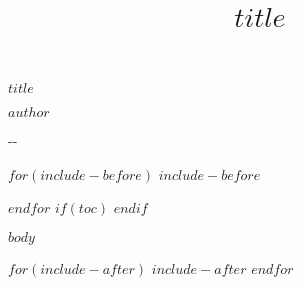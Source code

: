 \documentclass[$if(fontsize)$$fontsize$,$endif$$if(lang)$$lang$,$endif$$if(papersize)$$papersize$,$endif$$for(classoption)$$classoption$$sep$,$endfor$]{$documentclass$}
\title{$title$}
\title{}
\newcommand{\todaymetrum}{\the\year-\twodigit{\month}-\twodigit{\day}}
\newcommand{\doctitle}{$title$}
\begin{document}
\thispagestyle{empty}
\begin{center}


%
{\huge \doctitle}

\vspace{0.5cm}

$author$

\vspace{0.25cm}

\todaymetrum

\vspace{0.6cm}

\end{center}



$for(include-before)$
$include-before$

$endfor$
$if(toc)$
{
\hypersetup{linkcolor=$if(toccolor)$$toccolor$$else$black$endif$}
\setcounter{tocdepth}{$toc-depth$}
\tableofcontents
}
$endif$

%

$body$

$for(include-after)$
$include-after$
$endfor$
\end{document}
